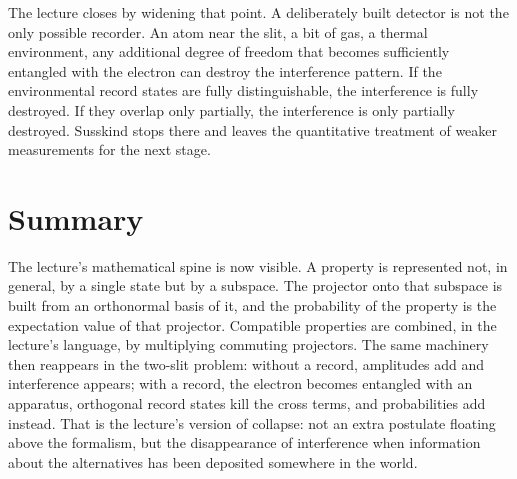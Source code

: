 The lecture closes by widening that point. A deliberately built detector is not the only possible recorder. An atom near the slit, a bit of gas, a thermal environment, any additional degree of freedom that becomes sufficiently entangled with the electron can destroy the interference pattern. If the environmental record states are fully distinguishable, the interference is fully destroyed. If they overlap only partially, the interference is only partially destroyed. Susskind stops there and leaves the quantitative treatment of weaker measurements for the next stage.

\section{Summary}

The lecture's mathematical spine is now visible. A property is represented not, in general, by a single state but by a subspace. The projector onto that subspace is built from an orthonormal basis of it, and the probability of the property is the expectation value of that projector. Compatible properties are combined, in the lecture's language, by multiplying commuting projectors. The same machinery then reappears in the two-slit problem: without a record, amplitudes add and interference appears; with a record, the electron becomes entangled with an apparatus, orthogonal record states kill the cross terms, and probabilities add instead. That is the lecture's version of collapse: not an extra postulate floating above the formalism, but the disappearance of interference when information about the alternatives has been deposited somewhere in the world.